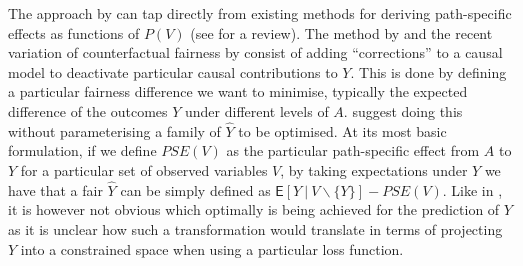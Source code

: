 \documentclass{article}
\begin{document}
The approach by \cite{ilya:18} can tap directly from existing methods
for deriving path-specific effects as functions of $P(V)$ (see
\cite{ilya:13} for a review).  The method by \cite{kilbertus:17} and
the recent variation of counterfactual fairness by \cite{silvia:18}
consist of adding ``corrections'' to a causal model to
deactivate particular causal contributions to $Y$. This is done by
defining a particular fairness difference we want to minimise, typically the expected difference of
the outcomes $Y$ under different levels of $A$. \cite{silvia:18} suggest doing this without
parameterising a family of $\hat Y$ to be optimised. At its most basic
formulation, if we define $PSE(V)$ as the particular path-specific effect from
$A$ to $Y$ for a particular set of observed variables $V$, by taking expectations under
$Y$ we have that a fair $\hat Y$ can be simply defined as $\mathsf E[Y\ |\ V
  \backslash \{Y\}] - PSE(V)$.  Like in \cite{ilya:18}, it is however
not obvious which optimally is being achieved for the prediction of
$Y$ as it is unclear how such a transformation would translate in terms of
projecting $Y$ into a constrained space when using a particular
loss function.
\end{document}
